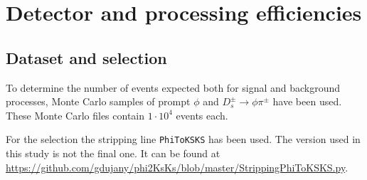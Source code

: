 \section{Detector and processing efficiencies}
\label{SEC:Efficiencies}

\subsection{Dataset and selection}

To determine the number of events expected both for signal and background processes, Monte Carlo samples of prompt $\phi$ and $D_s^\pm \rightarrow \phi \pi^\pm$ have been used. These Monte Carlo files contain $1\cdot10^4$ events each. 

For the selection the stripping line \verb!PhiToKSKS! has been used. The version used in this study is not the final one. It can be found at \url{https://github.com/gdujany/phi2KsKs/blob/master/StrippingPhiToKSKS.py}. 

